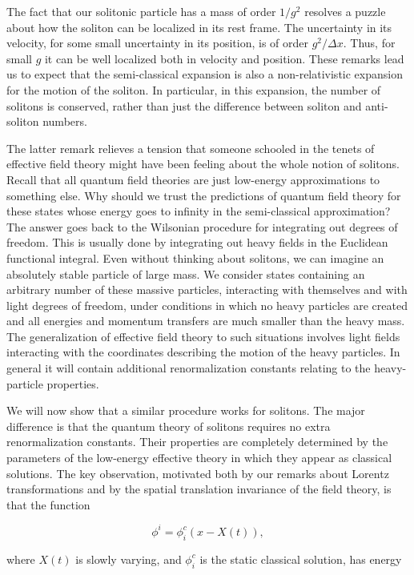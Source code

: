 The fact that our solitonic particle has a mass of order $1/g^2$ resolves a
puzzle about how the soliton can be localized in its rest frame. The uncertainty
in its velocity, for some small uncertainty in its position, is of order
$g^2/\Delta x$. Thus, for small $g$ it can be well localized both in velocity and
position. These remarks lead us to expect that the semi-classical expansion is
also a non-relativistic expansion for the motion of the soliton. In particular,
in this expansion, the number of solitons is conserved, rather than just the
difference between soliton and anti-soliton numbers.

The latter remark relieves a tension that someone schooled in the tenets of
effective field theory might have been feeling about the whole notion of
solitons. Recall that all quantum field theories are just low-energy
approximations to something else. Why should we trust the predictions of quantum
field theory for these states whose energy goes to infinity in the semi-classical
approximation? The answer goes back to the Wilsonian procedure for integrating
out degrees of freedom. This is usually done by integrating out heavy fields in
the Euclidean functional integral. Even without thinking about solitons, we can
imagine an absolutely stable particle of large mass. We consider states containing
an arbitrary number of these massive particles, interacting with themselves and
with light degrees of freedom, under conditions in which no heavy particles are
created and all energies and momentum transfers are much smaller than the heavy
mass. The generalization of effective field theory to such situations involves
light fields interacting with the coordinates describing the motion of the heavy
particles. In general it will contain additional renormalization constants
relating to the heavy-particle properties.

We will now show that a similar procedure works for solitons. The major
difference is that the quantum theory of solitons requires no extra
renormalization constants. Their properties are completely determined by the
parameters of the low-energy effective theory in which they appear as classical
solutions. The key observation, motivated both by our remarks about Lorentz
transformations and by the spatial translation invariance of the field theory,
is that the function

\[
  \phi^i=\phi_i^c(x-X(t)),
\]

where $X(t)$ is slowly varying, and $\phi_i^c$ is the static classical solution,
has energy

